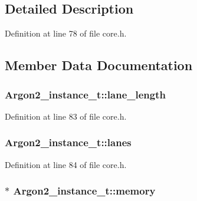\subsection{Detailed Description}


Definition at line 78 of file core.\+h.



\subsection{Member Data Documentation}
\hypertarget{struct_argon2__instance__t_a91274f0e1d85a39d29d7ab90a44e4c79}{}
\subsubsection[{lane\+\_\+length}]{ Argon2\+\_\+instance\+\_\+t\+::lane\+\_\+length}\label{struct_argon2__instance__t_a91274f0e1d85a39d29d7ab90a44e4c79}


Definition at line 83 of file core.\+h.

\hypertarget{struct_argon2__instance__t_ad2f436030b823c86269c589d6a923120}{}
\subsubsection[{lanes}]{ Argon2\+\_\+instance\+\_\+t\+::lanes}\label{struct_argon2__instance__t_ad2f436030b823c86269c589d6a923120}


Definition at line 84 of file core.\+h.

\hypertarget{struct_argon2__instance__t_a7feaf5341041e1c7aca88eb093ad67a3}{}
\subsubsection[{memory}]{$\ast$ Argon2\+\_\+instance\+\_\+t\+::memory}\label{struct_argon2__instance__t_a7feaf5341041e1c7aca88eb093ad67a3}


